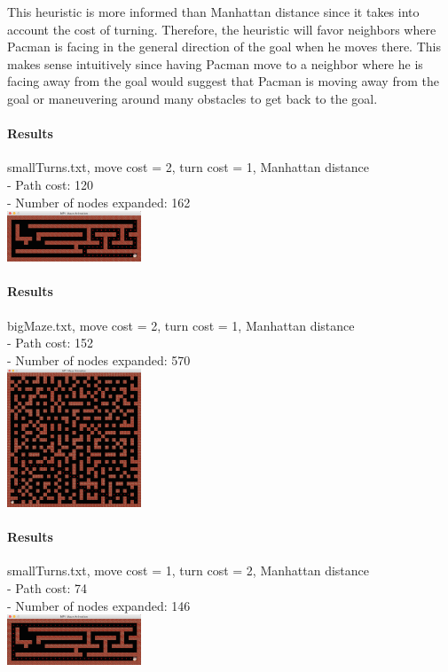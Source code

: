 \begin{multicols*}{2}
This heuristic is more informed than Manhattan distance since it takes into account the cost of turning. Therefore, the heuristic will favor neighbors where Pacman is facing in the general direction of the goal when he moves there. This makes sense intuitively since having Pacman move to a neighbor where he is facing away from the goal would suggest that Pacman is moving away from the goal or maneuvering around many obstacles to get back to the goal.

\paragraph{Results}
smallTurns.txt, move cost = 2, turn cost = 1, Manhattan distance\\
- Path cost: 120\\
- Number of nodes expanded: 162\\
\includegraphics[width=0.3\textwidth]{graphics/smallTurn_turns21.png}

\paragraph{Results}
bigMaze.txt, move cost = 2, turn cost = 1, Manhattan distance\\
- Path cost: 152\\
- Number of nodes expanded: 570\\
\includegraphics[width=0.3\textwidth]{graphics/bigMaze_turns21.png}

\paragraph{Results}
smallTurns.txt, move cost = 1, turn cost = 2, Manhattan distance\\
- Path cost: 74\\
- Number of nodes expanded: 146\\
\includegraphics[width=0.3\textwidth]{graphics/smallTurn_turns12.png}


\end{multicols*}
